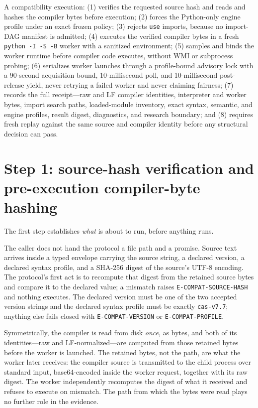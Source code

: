 \begin{protocol}\label{ch07:prot:closure}
A compatibility execution: (1) verifies the requested source hash and reads and hashes the compiler bytes before execution; (2) forces the Python-only engine profile under an exact frozen policy; (3) rejects \texttt{use} imports, because no import-DAG manifest is admitted; (4) executes the verified compiler bytes in a fresh \texttt{python -I -S -B} worker with a sanitized environment; (5) samples and binds the worker runtime before compiler code executes, without WMI or subprocess probing; (6) serializes worker launches through a profile-bound advisory lock with a 90-second acquisition bound, 10-millisecond poll, and 10-millisecond post-release yield, never retrying a failed worker and never claiming fairness; (7) records the full receipt---raw and LF compiler identities, interpreter and worker bytes, import search paths, loaded-module inventory, exact syntax, semantic, and engine profiles, result digest, diagnostics, and research boundary; and (8) requires fresh replay against the same source and compiler identity before any structural decision can pass.
\end{protocol}

\section{Step 1: source-hash verification and pre-execution compiler-byte hashing}\label{ch07:step1}

The first step establishes \emph{what} is about to run, before anything runs.

The caller does not hand the protocol a file path and a promise. Source text arrives inside a typed envelope carrying the source string, a declared version, a declared syntax profile, and a SHA-256 digest of the source's UTF-8 encoding. The protocol's first act is to recompute that digest from the retained source bytes and compare it to the declared value; a mismatch raises \texttt{E-COMPAT-SOURCE-HASH} and nothing executes. The declared version must be one of the two accepted version strings and the declared syntax profile must be exactly \texttt{cas-v7.7}; anything else fails closed with \texttt{E-COMPAT-VERSION} or \texttt{E-COMPAT-PROFILE}.

Symmetrically, the compiler is read from disk \emph{once}, as bytes, and both of its identities---raw and LF-normalized---are computed from those retained bytes before the worker is launched. The retained bytes, not the path, are what the worker later receives: the compiler source is transmitted to the child process over standard input, base64-encoded inside the worker request, together with its raw digest. The worker independently recomputes the digest of what it received and refuses to execute on mismatch. The path from which the bytes were read plays no further role in the evidence.

